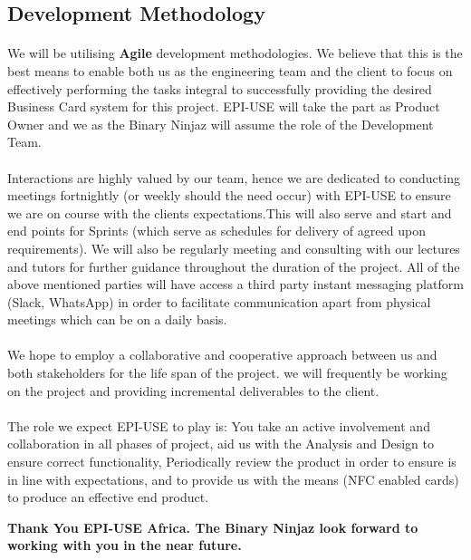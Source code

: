 \documentclass[11pt]{article}
\begin{document}
\subsection{Development Methodology}
\paragraph{} We will be utilising \textbf{Agile} development methodologies. We believe that this is the best means to enable both us as the engineering team and the client to focus on effectively performing the tasks integral to successfully providing the desired Business Card system for this project. EPI-USE will take the part as Product Owner and we as the Binary Ninjaz will assume the role of the Development Team. 

\paragraph{} 
Interactions are highly valued by our team, hence we are dedicated to conducting meetings fortnightly (or weekly should the need occur) with EPI-USE to ensure we are on course with the clients expectations.This will also serve and start and end points for Sprints (which serve as schedules for delivery of agreed upon requirements). We will also be regularly meeting and consulting with our lectures and tutors for further guidance throughout the duration of the project. All of the above mentioned parties will have access a third party instant messaging platform (Slack, WhatsApp) in order to facilitate communication apart from physical meetings which can be on a daily basis.

\paragraph{} 
We hope to employ a collaborative and cooperative approach between us and both stakeholders for the life span of the project. we will frequently be working on the project and providing incremental deliverables to the client. 

\paragraph{}
The role we expect EPI-USE to play is:
\newline You take an active involvement and collaboration in all phases of project, aid us with the Analysis and Design to ensure correct functionality, Periodically review the product in order to ensure  is in line with expectations, and to provide us with the means (NFC enabled cards) to produce an effective end product.

\begin{center}
{\sffamily\bfseries
\large Thank You EPI-USE Africa. The Binary Ninjaz look forward to working with you in the near future.
}
\end{center}
\end{document}
